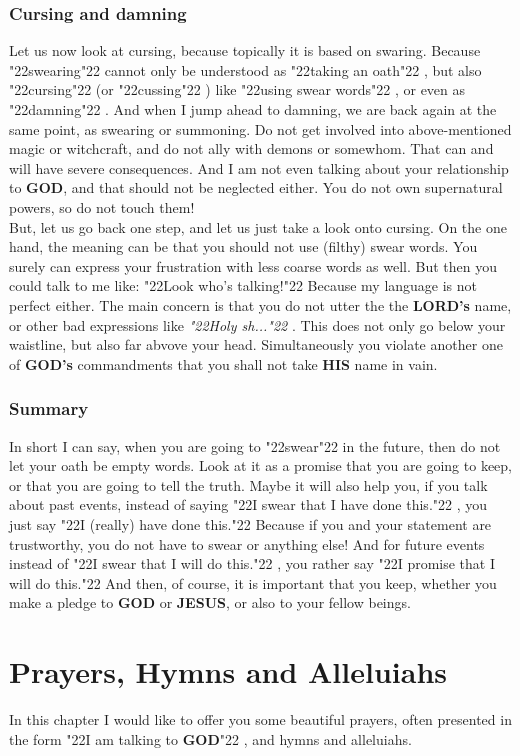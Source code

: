 \documentclass[12pt,a5paper]{article}
\newcommand{\God}[0]{\textbf{GOD}}
\newcommand{\Gods}[0]{\textbf{GOD's}}
\newcommand{\His}[0]{\textbf{HIS}}
\newcommand{\Jesus}[0]{\textbf{JESUS}}
\newcommand{\Lords}[0]{\textbf{LORD's}}
\newcommand{\q}[1]{\char"22{#1}\char"22 }
\begin{document}
	\subsubsection{Cursing and damning}
		Let us now look at cursing,
		because topically it is based on swaring.
		Because \q{swearing} cannot only be understood as \q{taking an oath},
		but also \q{cursing} (or \q{cussing})
		like \q{using swear words},
		or even as \q{damning}.
		And when I jump ahead to damning,
		we are back again at the same point,
		as swearing or summoning.
		Do not get involved into above-mentioned magic or witchcraft,
		and do not ally with demons or somewhom.
		That can and will have severe consequences.
		And I am not even talking about your relationship to {\God},
		and that should not be neglected either.
		You do not own supernatural powers,
		so do not touch them!
		\\
		But,
		let us go back one step,
		and let us just take a look onto cursing.
		On the one hand,
		the meaning can be that you should not use (filthy) swear words.
		You surely can express your frustration with less coarse words as well.
		But then you could talk to me like:
		\q{Look who's talking!}
		Because my language is not perfect either.
		The main concern is that you do not utter the the {\Lords} name,
		or other bad expressions like \textit{\q{Holy sh...}}.
		This does not only go below your waistline,
		but also far abvove your head.
		Simultaneously you violate another one of {\Gods} commandments that you shall not take {\His} name in vain.

	\subsubsection{Summary}
		In short I can say,
		when you are going to \q{swear} in the future,
		then do not let your oath be empty words.
		Look at it as a promise that you are going to keep,
		or that you are going to tell the truth.
		Maybe it will also help you,
		if you talk about past events,
		instead of saying \q{I swear that I have done this.},
		you just say \q{I (really) have done this.}
		Because if you and your statement are trustworthy,
		you do not have to swear or anything else!
		And for future events instead of \q{I swear that I will do this.},
		you rather say \q{I promise that I will do this.}
		And then,
		of course,
		it is important that you keep,
		whether you make a pledge to {\God} or {\Jesus},
		or also to your fellow beings.

	\newpage
	\section{Prayers, Hymns and Alleluiahs}
		In this chapter I would like to offer you some beautiful prayers,
		often presented in the form \q{I am talking to {\God}},
		and hymns and alleluiahs.
\end{document}
